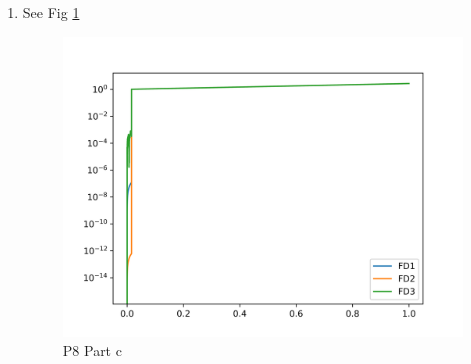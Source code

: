 \documentclass{article}
\begin{document}
\begin{enumerate}[label=\roman*)]
\begin{figure}[ht]
            \end{figure}
        \item See Fig \ref{fig:p8pc}
            \begin{figure}[ht]
                \centering
                \includegraphics[width=\textwidth]{prob8_partc.png}
                \caption{P8 Part c}
                \label{fig:p8pc}
            \end{figure}

    \end{enumerate}
    
\end{document}
